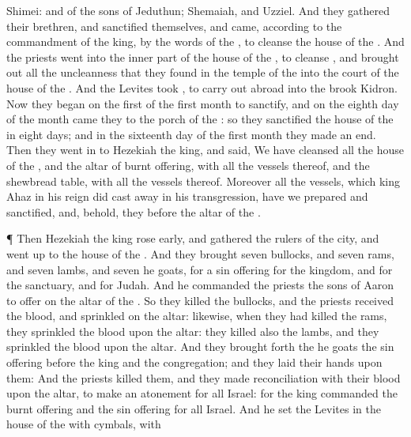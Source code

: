 {Shimei: and of the
sons of
Jeduthun;
Shemaiah, and
Uzziel.
And they
gathered their
brethren, and
sanctified themselves, and
came, according to the
commandment of the
king, by the
words of the
{}, to
cleanse the
house of the
{}.
And the
priests
went into the inner
part of the
house of the
{}, to
cleanse
{}, and brought
out all the
uncleanness that they
found in the
temple of the
{} into the
court of the
house of the
{}. And the
Levites
took
{}, to carry
{}
out
abroad into the
brook
Kidron.
Now they
began on the
first
{} of the
first
month to
sanctify, and on the
eighth
day of the
month
came they to the
porch of the
{}: so they
sanctified the
house of the
{} in
eight
days; and in the
sixteenth day of the
first
month they made an
end.
Then they
went
in to
Hezekiah the
king, and
said, We have
cleansed all the
house of the
{}, and the
altar of burnt
offering, with all the
vessels thereof, and the
shewbread
table, with all the
vessels thereof.
Moreover all the
vessels, which
king
Ahaz in his
reign did cast
away in his
transgression, have we
prepared and
sanctified, and, behold, they
{}
before the
altar of the
{}.
\par }{\PP {}¶ Then
Hezekiah the
king rose
early, and
gathered the
rulers of the
city, and went
up to the
house of the
{}.
And they
brought
seven
bullocks, and
seven
rams, and
seven
lambs, and
seven
he
goats, for a sin
offering for the
kingdom, and for the
sanctuary, and for
Judah. And he
commanded the
priests the
sons of
Aaron to
offer
{} on the
altar of the
{}.
So they
killed the
bullocks, and the
priests
received the
blood, and
sprinkled
{} on the
altar: likewise, when they had
killed the
rams, they
sprinkled the
blood upon the
altar: they
killed also the
lambs, and they
sprinkled the
blood upon the
altar.
And they brought
forth the he
goats
{} the sin
offering
before the
king and the
congregation; and they
laid their
hands upon them:
And the
priests
killed them, and they made
reconciliation with their
blood upon the
altar, to make an
atonement for all
Israel: for the
king
commanded
{} the burnt
offering and the sin
offering
{} for all
Israel.
And he
set the
Levites in the
house of the
{} with
cymbals, with
}
